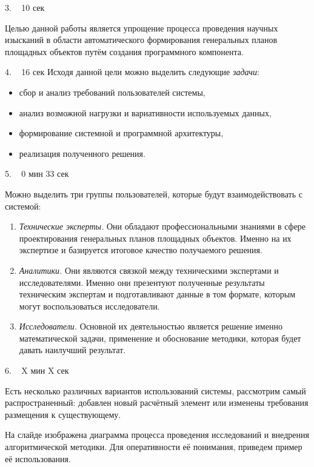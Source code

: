 \documentclass[11pt]{article}
\begin{document}
    3. ~ 10 сек

    Целью данной работы является
    упрощение процесса проведения научных изысканий
    в области автоматического формирования генеральных планов площадных объектов
    путём создания программного компонента.

    4. ~ 16 сек
    Исходя данной цели можно выделить следующие \textit{задачи}:
    \begin{itemize}
        \item сбор и анализ требований пользователей системы,
        \item анализ возможной нагрузки и вариативности используемых данных,
        \item формирование системной и программной архитектуры,
        \item реализация полученного решения.
    \end{itemize}

    5. ~ 0 мин 33 сек

    Можно выделить три группы пользователей, которые будут взаимодействовать с системой:
    \begin{enumerate}
        \item {
            \textit{Технические эксперты.} Они обладают профессиональными знаниями в сфере
            проектирования генеральных планов площадных объектов. Именно на их экспертизе и базируется итоговое
            качество получаемого решения.
        }
        \item{
            \textit{Аналитики.} Они являются связкой между техническими экспертами и исследователями.
            Именно они презентуют полученные результаты техническим экспертам и подготавливают данные в том формате,
            которым могут воспользоваться исследователи.
        }
        \item{
            \textit{Исследователи.} Основной их деятельностью является решение именно математической задачи,
            применение и обоснование методики, которая будет давать наилучший результат.
        }
    \end{enumerate}

    6. ~ X мин X сек

    Есть несколько различных вариантов использований системы, рассмотрим самый распространенный:
    добавлен новый расчётный элемент или изменены требования размещения к существующему.

    На слайде изображена диаграмма процесса проведения исследований и
    внедрения алгоритмической методики. Для оперативности её понимания,
    приведем пример её использования.
\end{document}
